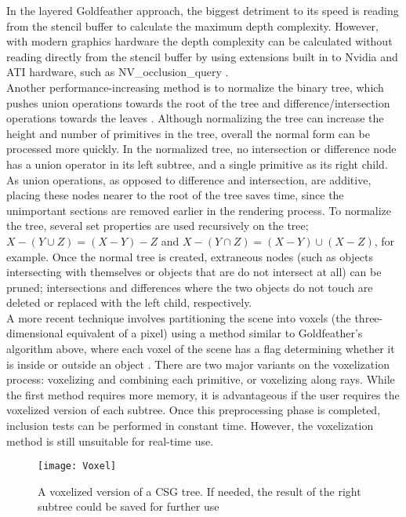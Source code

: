 \documentclass[12pt]{article}
\begin{document}
\begin{doublespace}
In the layered Goldfeather approach, the biggest detriment to its speed is reading from the stencil buffer to calculate the maximum depth complexity. However, with modern graphics hardware the depth complexity can be calculated without reading directly from the stencil buffer by using extensions built in to Nvidia and ATI hardware, such as NV\_occlusion\_query \cite{hardware_csg}.\\

Another performance-increasing method is to normalize the binary tree, which pushes union operations towards the root of the tree and difference/intersection operations towards the leaves \cite{advanced_opengl}. Although normalizing the tree can increase the height and number of primitives in the tree, overall the normal form can be processed more quickly. In the normalized tree, no intersection or difference node has a union operator in its left subtree, and a single primitive as its right child. As union operations, as opposed to difference and intersection, are additive, placing these nodes nearer to the root of the tree saves time, since the unimportant sections are removed earlier in the rendering process. To normalize the tree, several set properties are used recursively on the tree; $X-(Y\cup Z)=(X-Y)-Z$ and $X-(Y\cap Z) = (X-Y)\cup(X-Z)$, for example. Once the normal tree is created, extraneous nodes (such as objects intersecting with themselves or objects that are do not intersect at all) can be pruned; intersections and differences where the two objects do not touch are deleted or replaced with the left child, respectively.\\

A more recent technique involves partitioning the scene into voxels (the three-dimensional equivalent of a pixel) using a method similar to Goldfeather's algorithm above, where each voxel of the scene has a flag determining whether it is inside or outside an object \cite{geoinformation}. There are two major variants on the voxelization process: voxelizing and combining each primitive, or voxelizing along rays. While the first method requires more memory, it is advantageous if the user requires the voxelized version of each subtree. Once this preprocessing phase is completed, inclusion tests can be performed in constant time. However, the voxelization method is still unsuitable for real-time use.\\

\begin{figure}[h]
  \texttt{[image: Voxel]}
  \centering
  \caption{A voxelized version of a CSG tree. If needed, the result of the right subtree could be saved for further use}
\end{figure}


\end{doublespace}
\end{document}
